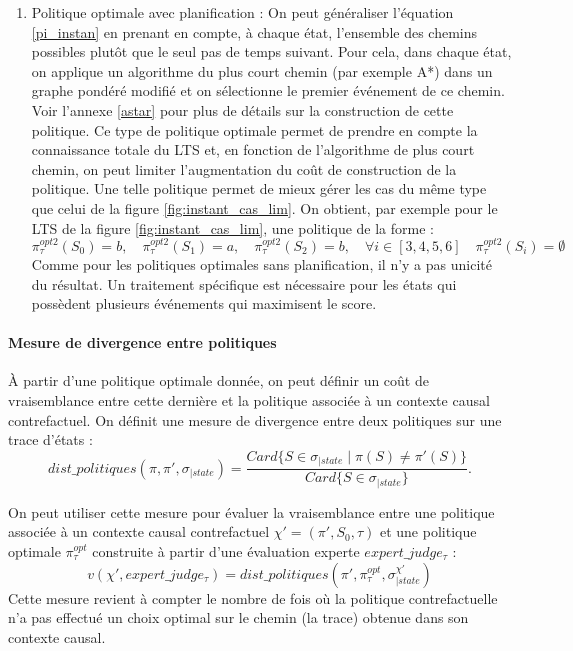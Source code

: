\begin{enumerate}
     \item Politique optimale avec planification : On peut généraliser l'équation \ref{pi_instan} en prenant en compte, à chaque état, l'ensemble des chemins possibles plutôt que le seul pas de temps suivant. Pour cela, dans chaque état, on applique un algorithme du plus court chemin (par exemple A*) dans un graphe pondéré modifié et on sélectionne le premier événement de ce chemin. Voir l'annexe \ref{astar} pour plus de détails sur la construction de cette politique. Ce type de politique optimale permet de prendre en compte la connaissance totale du LTS et, en fonction de l'algorithme de plus court chemin, on peut limiter l'augmentation du coût de construction de la politique. Une telle politique permet de mieux gérer les cas du même type que celui de la figure \ref{fig:instant_cas_lim}. On obtient, par exemple pour le LTS de la figure \ref{fig:instant_cas_lim}, une politique de la forme :
     \begin{equation}
         \pi_\tau^{opt2}(S_0)=b,\quad \pi_\tau^{opt2}(S_1)=a,\quad \pi_\tau^{opt2}(S_2)=b,\quad \forall i\in[3,4,5,6]\quad  \pi^{opt2}_\tau(S_i)=\emptyset
     \end{equation}
     Comme pour les politiques optimales sans planification, il n'y a pas unicité du résultat. Un traitement spécifique est nécessaire pour les états qui possèdent plusieurs événements qui maximisent le score.
 \end{enumerate}


\paragraph{Mesure de divergence entre politiques}

À partir d'une politique optimale donnée, on peut définir un coût de vraisemblance entre cette dernière et la politique associée à un contexte causal contrefactuel. On définit une mesure de divergence entre deux politiques sur une trace d'états : 
\begin{equation}
dist\_politiques(\pi,\pi',\sigma_{|state}) =\frac{ Card\{S\in \sigma_{|state} \mid \pi(S) \neq \pi'(S)\}}{Card\{S\in \sigma_{|state}\}}.    
\end{equation}

On peut utiliser cette mesure pour évaluer la vraisemblance entre une politique associée à un contexte causal contrefactuel $\chi' = (\pi',S_0,\tau)$ et une politique optimale $\pi^{opt}_\tau$ construite à partir d'une évaluation experte $expert\_judge_\tau$ :
\begin{equation}
    v(\chi',expert\_judge_\tau)= dist\_politiques(\pi',\pi^{opt}_\tau, \sigma^{\chi'}_{|state})
\end{equation}
Cette mesure revient à compter le nombre de fois où la politique contrefactuelle n'a pas effectué un choix optimal sur le chemin (la trace) obtenue dans son contexte causal.
\newline

